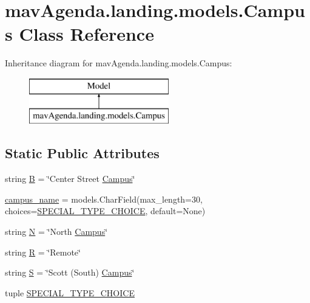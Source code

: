 \hypertarget{classmavAgenda_1_1landing_1_1models_1_1Campus}{}\section{mav\+Agenda.\+landing.\+models.\+Campus Class Reference}
\label{classmavAgenda_1_1landing_1_1models_1_1Campus}
Inheritance diagram for mav\+Agenda.\+landing.\+models.\+Campus\+:\begin{figure}[H]
\begin{center}
\leavevmode
\includegraphics[height=2.000000cm]{classmavAgenda_1_1landing_1_1models_1_1Campus}
\end{center}
\end{figure}
\subsection*{Static Public Attributes}
\begin{DoxyCompactItemize}
\item 
string \mbox{\hyperlink{classmavAgenda_1_1landing_1_1models_1_1Campus_a9ff48a7b3dbaf090ab078c9a8cc9cee9}{B}} = \char`\"{}Center Street \mbox{\hyperlink{classmavAgenda_1_1landing_1_1models_1_1Campus}{Campus}}\char`\"{}
\item 
\mbox{\hyperlink{classmavAgenda_1_1landing_1_1models_1_1Campus_abe6e6874761cf74ba056896de95a3027}{campus\+\_\+name}} = models.\+Char\+Field(max\+\_\+length=30, choices=\mbox{\hyperlink{classmavAgenda_1_1landing_1_1models_1_1Campus_a195ab5d13273734c2c81094080bc6ee5}{S\+P\+E\+C\+I\+A\+L\+\_\+\+T\+Y\+P\+E\+\_\+\+C\+H\+O\+I\+CE}}, default=None)
\item 
string \mbox{\hyperlink{classmavAgenda_1_1landing_1_1models_1_1Campus_a207e9ada0e38926cf13be254a4a8e175}{N}} = \char`\"{}North \mbox{\hyperlink{classmavAgenda_1_1landing_1_1models_1_1Campus}{Campus}}\char`\"{}
\item 
string \mbox{\hyperlink{classmavAgenda_1_1landing_1_1models_1_1Campus_af2c1559ab3b66526ffd9848a5b401897}{R}} = \char`\"{}Remote\char`\"{}
\item 
string \mbox{\hyperlink{classmavAgenda_1_1landing_1_1models_1_1Campus_aac9f2d73ca155cc16736c14ef8ddeb51}{S}} = \char`\"{}Scott (South) \mbox{\hyperlink{classmavAgenda_1_1landing_1_1models_1_1Campus}{Campus}}\char`\"{}
\item 
tuple \mbox{\hyperlink{classmavAgenda_1_1landing_1_1models_1_1Campus_a195ab5d13273734c2c81094080bc6ee5}{S\+P\+E\+C\+I\+A\+L\+\_\+\+T\+Y\+P\+E\+\_\+\+C\+H\+O\+I\+CE}}
\end{DoxyCompactItemize}


